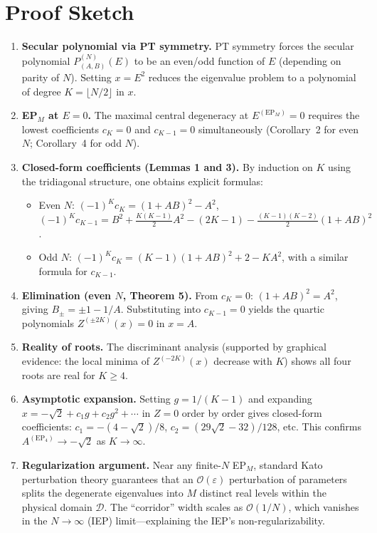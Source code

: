 \documentclass[11pt,a4paper]{article}
\begin{document}
\section{Proof Sketch}

\begin{enumerate}[leftmargin=1.5em]
  \item \textbf{Secular polynomial via PT symmetry.}
    PT symmetry forces the secular polynomial $P^{(N)}_{(A,B)}(E)$ to be an even/odd function of $E$ (depending on parity of $N$).  Setting $x = E^2$ reduces the eigenvalue problem to a polynomial of degree $K = \lfloor N/2 \rfloor$ in $x$.

  \item \textbf{EP$_M$ at $E=0$.}
    The maximal central degeneracy at $E^{(\mathrm{EP}_M)} = 0$ requires the lowest coefficients $c_K = 0$ and $c_{K-1} = 0$ simultaneously (Corollary~2 for even $N$; Corollary~4 for odd $N$).

  \item \textbf{Closed-form coefficients (Lemmas 1 and 3).}
    By induction on $K$ using the tridiagonal structure, one obtains explicit formulas:
    \begin{itemize}
      \item Even $N$: $(-1)^K c_K = (1+AB)^2 - A^2$, \; $(-1)^K c_{K-1} = B^2 + \tfrac{K(K{-}1)}{2}A^2 - (2K{-}1) - \tfrac{(K{-}1)(K{-}2)}{2}(1+AB)^2$.
      \item Odd $N$: $(-1)^K c_K = (K{-}1)(1+AB)^2 + 2 - KA^2$, with a similar formula for $c_{K-1}$.
    \end{itemize}

  \item \textbf{Elimination (even $N$, Theorem 5).}
    From $c_K = 0$: $(1+AB)^2 = A^2$, giving $B_\pm = \pm 1 - 1/A$.  Substituting into $c_{K-1} = 0$ yields the quartic polynomials $Z^{(\pm 2K)}(x) = 0$ in $x = A$.

  \item \textbf{Reality of roots.}
    The discriminant analysis (supported by graphical evidence: the local minima of $Z^{(-2K)}(x)$ decrease with $K$) shows all four roots are real for $K \ge 4$.

  \item \textbf{Asymptotic expansion.}
    Setting $g = 1/(K{-}1)$ and expanding $x = -\sqrt{2} + c_1 g + c_2 g^2 + \cdots$ in $Z = 0$ order by order gives closed-form coefficients: $c_1 = -(4-\sqrt{2})/8$, $c_2 = (29\sqrt{2}-32)/128$, etc.  This confirms $A^{(\mathrm{EP}_4)} \to -\sqrt{2}$ as $K \to \infty$.

  \item \textbf{Regularization argument.}
    Near any finite-$N$ EP$_M$, standard Kato perturbation theory guarantees that an $\mathcal{O}(\varepsilon)$ perturbation of parameters splits the degenerate eigenvalues into $M$ distinct real levels within the physical domain $\mathcal{D}$.  The ``corridor'' width scales as $\mathcal{O}(1/N)$, which vanishes in the $N \to \infty$ (IEP) limit---explaining the IEP's non-regularizability.
\end{enumerate}
\end{document}
